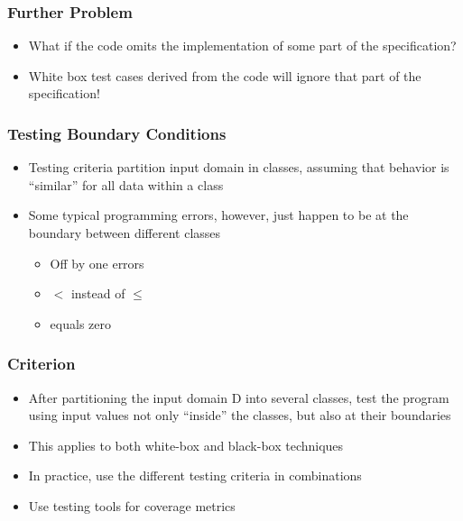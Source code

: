 \documentclass[t,12pt,numbers,fleqn]{beamer}
\begin{document}

\begin{frame}
\frametitle{Further Problem}

\begin{itemize}
\item What if the code omits the implementation of some part of the specification?
\item White box test cases derived from the code will ignore that part of the specification!
\end{itemize}

\end{frame}


\begin{frame}
\frametitle{Testing Boundary Conditions}

\begin{itemize}

\item Testing criteria partition input domain in classes, assuming that behavior
  is ``similar'' for all data within a class
\item Some typical programming errors, however, just happen to be at the
  boundary between different classes
\begin{itemize}
\item Off by one errors
\item $<$ instead of $\leq$
\item equals zero
\end{itemize}
\end{itemize}

\end{frame}


\begin{frame}
\frametitle{Criterion}

\begin{itemize}

\item After partitioning the input domain D into several classes, test the
  program using input values not only ``inside'' the classes, but also at their
  boundaries
\item This applies to both white-box and black-box techniques
\item In practice, use the different testing criteria in combinations
\item Use testing tools for coverage metrics
\end{itemize}

\end{frame}
\end{document}
